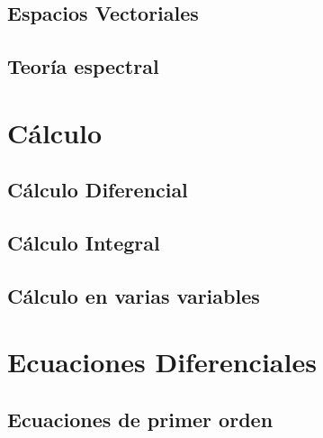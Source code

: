 \documentclass[
]{amsbook}
\begin{document}
\chapter{Espacios Vectoriales}







\chapter{Teoría espectral}




	
\part{Cálculo}
	
\chapter{Cálculo Diferencial}








\chapter{Cálculo Integral}
	








\chapter{Cálculo en varias variables}



\part{Ecuaciones Diferenciales}

\chapter{Ecuaciones de primer orden}




\end{document}
